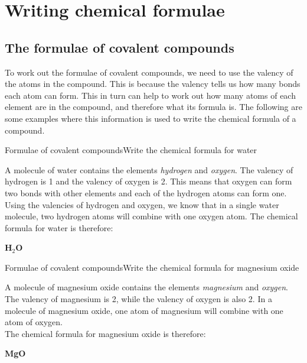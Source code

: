 



\section{Writing chemical formulae}

\subsection{The formulae of covalent compounds}

To work out the formulae of covalent compounds, we need to use the valency of the atoms in the compound. This is because the valency tells us how many bonds each atom can form. This in turn can help to work out how many atoms of each element are in the compound, and therefore what its formula is. The following are some examples where this information is used to write the chemical formula of a compound.

\begin{wex}{Formulae of covalent compounds}{Write the chemical formula for water}{
A molecule of water contains the elements \textit{hydrogen} and \textit{oxygen}.
The valency of hydrogen is 1 and the valency of oxygen is 2. This means that oxygen can form two bonds with other elements and each of the hydrogen atoms can form one.
Using the valencies of hydrogen and oxygen, we know that in a single water molecule, two hydrogen atoms will combine with one oxygen atom. The chemical formula for water is therefore:
\begin{center}
\textbf{H$_2$O}
\end{center}}
\end{wex}

\begin{wex}{Formulae of covalent compounds}{Write the chemical formula for magnesium oxide}{
A molecule of magnesium oxide contains the elements \textit{magnesium} and \textit{oxygen}.
The valency of magnesium is
2, while the valency of oxygen is also 2. In a molecule of magnesium oxide, one atom of magnesium will combine with one atom
of oxygen. \\
The chemical formula for magnesium oxide is therefore:

\begin{center}
\textbf{MgO}
\end{center}}
\end{wex}

